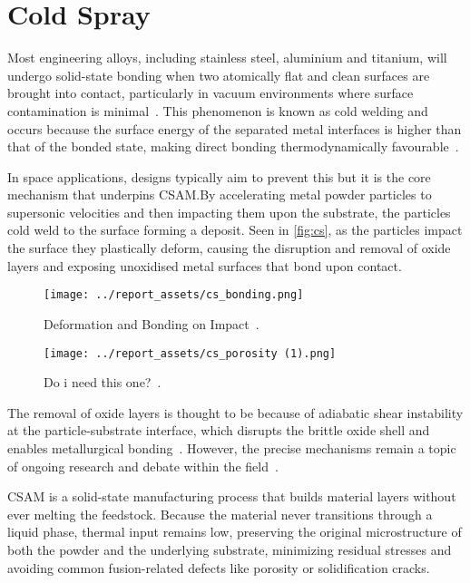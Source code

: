 
\section{Cold Spray}\label{sec:cold-spray}
Most engineering alloys, including stainless steel, aluminium and titanium, will undergo solid-state bonding when two atomically flat and clean surfaces are brought into contact, particularly in vacuum environments where surface contamination is minimal~\cite{merstallinger2009coldwelding}. 
This phenomenon is known as cold welding and occurs because the surface energy of the separated metal interfaces is higher than that of the bonded state, making direct bonding thermodynamically favourable~\cite{WagleBaker2015}. 

In space applications, designs typically aim to prevent this but it is the core mechanism that underpins CSAM.\@ By accelerating metal powder particles to supersonic velocities and then impacting them upon the substrate, the particles cold weld to the surface forming a deposit. Seen in \autoref{fig:cs}, as the particles impact the surface they plastically deform, causing the disruption and removal of oxide layers and exposing unoxidised metal surfaces that bond upon contact. 
\begin{figure}[htbp]
    \centering
    
    \begin{minipage}{0.45\textwidth}
        \centering
        \texttt{[image: ../report\_assets/cs\_bonding.png]}
        \caption*{Deformation and Bonding on Impact~\cite{ZHANG2024137157}.}
    \end{minipage}
    \hfill
    \begin{minipage}{0.45\textwidth}
        \centering
        \texttt{[image: ../report\_assets/cs\_porosity (1).png]}
        \caption*{Do i need this one?~\cite{coatings13040738}.}
    \end{minipage}
    
\end{figure}\label{fig:cs}
The removal of oxide layers is thought to be because of adiabatic shear instability at the particle-substrate interface, which disrupts the brittle oxide shell and enables metallurgical bonding~\cite{assadi2016cold}. However, the precise mechanisms remain a topic of ongoing research and debate within the field~\cite{HASSANIGANGARAJ2018430}.

CSAM is a solid-state manufacturing process that builds material layers without ever melting the feedstock. Because the material never transitions through a liquid phase, thermal input remains low, preserving the original microstructure of both the powder and the underlying substrate, minimizing residual stresses and avoiding common fusion-related defects like porosity or solidification cracks. 

